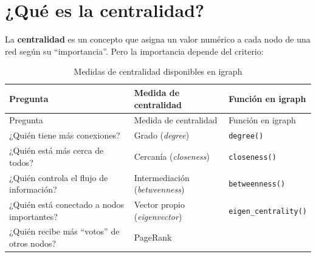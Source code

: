 \documentclass[
  letterpaper,
  DIV=11,
  numbers=noendperiod]{scrreprt}
\begin{document}
\section{¿Qué es la centralidad?}\label{quuxe9-es-la-centralidad}

La \textbf{centralidad} es un concepto que asigna un valor numérico a
cada nodo de una red según su ``importancia''. Pero la importancia
depende del criterio:

\begin{longtable}[]{@{}
  >{\raggedright\arraybackslash}p{}
  >{\raggedright\arraybackslash}p{}
  >{\raggedright\arraybackslash}p{}@{}}
\caption{Medidas de centralidad disponibles en igraph}\tabularnewline
\toprule\noalign{}
\begin{minipage}[b]{\linewidth}\raggedright
Pregunta
\end{minipage} & \begin{minipage}[b]{\linewidth}\raggedright
Medida de centralidad
\end{minipage} & \begin{minipage}[b]{\linewidth}\raggedright
Función en igraph
\end{minipage} \\
\midrule\noalign{}
\endfirsthead
\toprule\noalign{}
\begin{minipage}[b]{\linewidth}\raggedright
Pregunta
\end{minipage} & \begin{minipage}[b]{\linewidth}\raggedright
Medida de centralidad
\end{minipage} & \begin{minipage}[b]{\linewidth}\raggedright
Función en igraph
\end{minipage} \\
\midrule\noalign{}
\endhead
\bottomrule\noalign{}
\endlastfoot
¿Quién tiene más conexiones? & Grado (\emph{degree}) &
\texttt{degree()} \\
¿Quién está más cerca de todos? & Cercanía (\emph{closeness}) &
\texttt{closeness()} \\
¿Quién controla el flujo de información? & Intermediación
(\emph{betweenness}) & \texttt{betweenness()} \\
¿Quién está conectado a nodos importantes? & Vector propio
(\emph{eigenvector}) & \texttt{eigen\_centrality()} \\
¿Quién recibe más ``votos'' de otros nodos? & PageRank &

\end{longtable}
\end{document}
